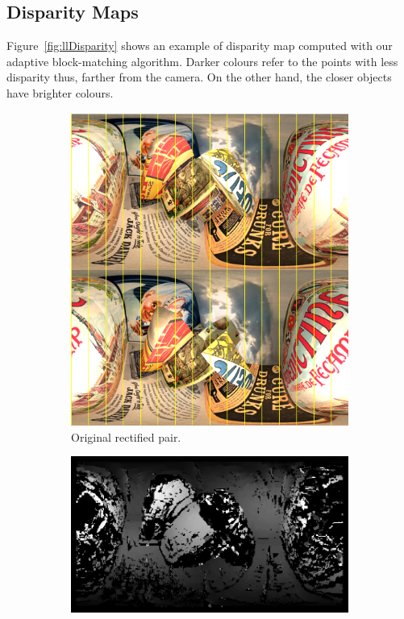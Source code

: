 \subsection{Disparity Maps}
Figure~\ref{fig:llDisparity} shows an example of disparity map computed
with our adaptive block-matching algorithm. Darker colours refer to the points
with less disparity thus, farther from the camera. On the other hand, the closer
objects have brighter colours.
%
\begin{figure}[h]
\centering
	\begin{subfigure}{0.7\linewidth}
		\centering
		\includegraphics[width=\linewidth]{img/rectified_pair.png}
		\caption{Original rectified pair.}
	\end{subfigure}
	\begin{subfigure}{0.7\linewidth}
		\centering
		\includegraphics[width=\linewidth]{img/lldisparity2.png}

\end{subfigure}
\end{figure}
